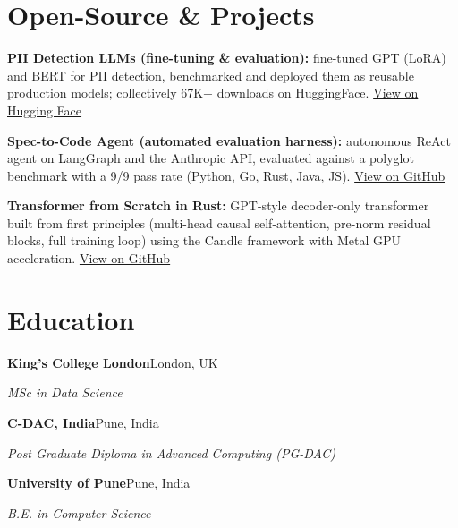 \documentclass[10pt,a4paper]{article}
\begin{document}
\section{Open-Source \& Projects}
\begin{tight}
  \item \textbf{PII Detection LLMs (fine-tuning \& evaluation):} fine-tuned GPT (LoRA) and BERT for PII detection, benchmarked and deployed them as reusable production models; collectively 67K+ downloads on HuggingFace. \href{https://huggingface.co/ab-ai/pii_model}{View on Hugging Face}
  \item \textbf{Spec-to-Code Agent (automated evaluation harness):} autonomous ReAct agent on LangGraph and the Anthropic API, evaluated against a polyglot benchmark with a 9/9 pass rate (Python, Go, Rust, Java, JS). \href{https://github.com/abhijeetscode/Spec-to-Code-Agent}{View on GitHub}
  \item \textbf{Transformer from Scratch in Rust:} GPT-style decoder-only transformer built from first principles (multi-head causal self-attention, pre-norm residual blocks, full training loop) using the Candle framework with Metal GPU acceleration. \href{https://github.com/abhijeetscode/transformer-rust}{View on GitHub}
\end{tight}

\section{Education}
{\color{company}\bfseries King's College London}\hfill {\color{muted}London, UK}\par
{\itshape MSc in Data Science}\par\vspace{2pt}
{\color{company}\bfseries C-DAC, India}\hfill {\color{muted}Pune, India}\par
{\itshape Post Graduate Diploma in Advanced Computing (PG-DAC)}\par\vspace{2pt}
{\color{company}\bfseries University of Pune}\hfill {\color{muted}Pune, India}\par
{\itshape B.E. in Computer Science}\par
\end{document}
